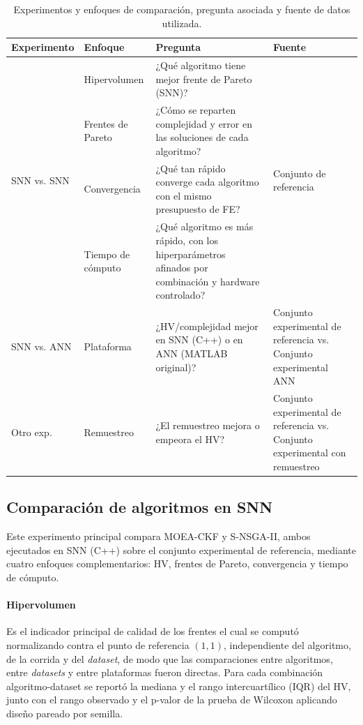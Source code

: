 \begin{table}[htbp]
\centering
    \small
    \caption{Experimentos y enfoques de comparación, pregunta asociada y fuente de datos utilizada.}
    \label{tab:angulos-comparacion}
\begin{tabular}{lp{2.1cm}p{5cm}p{4.2cm}}
\hline
\textbf{Experimento} & \textbf{Enfoque}&\textbf{Pregunta}& \textbf{Fuente}  \\ \hline
\multirow{4}{*}{SNN vs. SNN}        & Hipervolumen      & ¿Qué algoritmo tiene mejor frente de Pareto (SNN)?                         & \multirow{4}{*}{Conjunto de referencia}\\
& Frentes de Pareto & ¿Cómo se reparten complejidad y error en las soluciones de cada algoritmo? &\\
& Convergencia      & ¿Qué tan rápido converge cada algoritmo con el mismo presupuesto de FE?    &\\
& Tiempo de cómputo & ¿Qué algoritmo es más rápido, con los hiperparámetros afinados por combinación y hardware controlado? &\\ \hline
SNN vs. ANN                         & Plataforma        & ¿HV/complejidad mejor en SNN (C++) o en ANN (MATLAB original)?             & Conjunto experimental de referencia vs. Conjunto experimental ANN            \\ \hline
Otro exp. & Remuestreo        & ¿El remuestreo mejora o empeora el HV?                                     & Conjunto experimental de referencia vs. Conjunto experimental con remuestreo \\\hline
\end{tabular}
\end{table}

\subsection{Comparación de algoritmos en SNN}\label{sec:metodologia-estudio1}

Este experimento principal compara MOEA-CKF y S-NSGA-II, ambos ejecutados en SNN (C++) sobre el conjunto experimental de referencia, mediante cuatro enfoques complementarios: HV, frentes de Pareto, convergencia y tiempo de cómputo.

\paragraph{Hipervolumen}

Es el indicador principal de calidad de los frentes el cual se computó normalizando contra el punto de referencia \((1,1)\), independiente del algoritmo, de la corrida y del \textit{dataset}, de modo que las comparaciones entre algoritmos, entre \textit{datasets} y entre plataformas fueron directas. Para cada combinación algoritmo-dataset se reportó la mediana y el rango intercuartílico (IQR) del HV, junto con el rango observado y el p-valor de la prueba de Wilcoxon aplicando diseño pareado por semilla.

